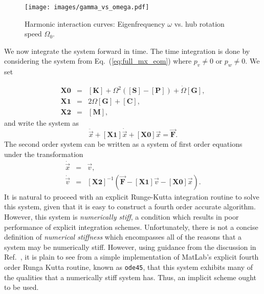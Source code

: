 \begin{figure}[ht!]
\caption{Harmonic interaction curves: Eigenfrequency $\omega$ vs. hub rotation speed $\Omega_0$.}
\label{fig:om_v_Om}
\centering
\texttt{[image: images/gamma\_vs\_omega.pdf]}
\end{figure}

We now integrate the system forward in time. The time integration is done by considering the system from Eq.~(\ref{eq:full_mx_eom}) where $p_v\neq 0$ or $p_w\neq 0$. We set

\begin{eqnarray}
\mathbf{X0} & = & [\mathbf K]+\Omega^2([\mathbf S]-[\mathbf P])+\dot\Omega[\mathbf G],\\
\mathbf{X1} & = & 2\Omega[\mathbf G]+[\mathbf{C}],\label{eq:damping}\\
\mathbf{X2} & = & [\mathbf M],
\end{eqnarray}
and write the system as
\begin{equation}
[\mathbf{X2}]\ddot{\vec x}+[\mathbf{X1}]\dot{\vec x}+[\mathbf{X0}]\vec x=\vec{\mathbf{F}}.
\end{equation}
The second order system can be written as a system of first order equations under the transformation
\begin{eqnarray}
\dot{\vec x} &=& \vec v,\\
\dot{\vec v} &=&  [\mathbf{X2}]^{-1}\left(\vec{\mathbf{F}}-[\mathbf{X1}]\vec v-[\mathbf{X0}]\vec x\right).\label{eq:ode_with_force}
\end{eqnarray}
It is natural to proceed with an explicit Runge-Kutta integration routine to solve this system, given that it is easy to construct a fourth order accurate algorithm. However, this system is \emph{numerically stiff}, a condition which results in poor performance of explicit integration schemes. Unfortunately, there is not a concise definition of \emph{numerical stiffness} which encompasses all of the reasons that a system may be numerically stiff. However, using guidance from the discussion in Ref.~\cite{lambert1991numerical}, it is plain to see from a simple implementation of MatLab's explicit fourth order Runga Kutta routine, known as \texttt{ode45}, that this system exhibits many of the qualities that a numerically stiff system has. Thus, an implicit scheme ought to be used. 

